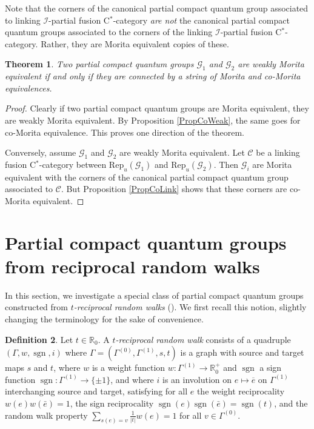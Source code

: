 \documentclass[10pt]{article}
\DeclareMathOperator{\sgn}{\mathrm{sgn}}
\newcommand{\R}{\mathbb{R}}
\newcommand{\CatCC}{\mathscr{C}}
\newcommand{\Rep}{\mathrm{Rep}}
\newtheorem{Theorem}{Theorem}[section]
\theoremstyle{definition}
\newtheorem{Def}[Theorem]{Definition}
\numberwithin{equation}{section}
\begin{document}
Note that the corners of the canonical partial compact quantum group associated to linking $\mathscr{I}$-partial fusion C$^*$-category \emph{are not} the canonical partial compact quantum groups associated to the corners of the linking $\mathscr{I}$-partial fusion C$^*$-category. Rather, they are Morita equivalent copies of these.

\begin{Theorem} Two partial compact quantum groups $\mathscr{G}_1$ and $\mathscr{G}_2$ are weakly Morita equivalent if and only if they are connected by a string of Morita and co-Morita equivalences. 
\end{Theorem}

\begin{proof} Clearly if two partial compact quantum groups are Morita equivalent, they are weakly Morita equivalent. By Proposition \ref{PropCoWeak}, the same goes for co-Morita equivalence. This proves one direction of the theorem. 

Conversely, assume $\mathscr{G}_1$ and $\mathscr{G}_2$ are weakly Morita equivalent. Let $\CatCC$ be a linking fusion C$^*$-category between $\Rep_u(\mathscr{G}_1)$ and $\Rep_u(\mathscr{G}_2)$. Then $\mathscr{G}_i$ are Morita equivalent with the corners of the canonical partial compact quantum group associated to $\CatCC$. But Proposition \ref{PropCoLink} shows that these corners are co-Morita equivalent. 
\end{proof} 


\section{Partial compact quantum groups from reciprocal random walks}\label{SecDyn}

In this section, we investigate a special class of partial compact quantum groups constructed from \emph{$t$-reciprocal random walks} (\cite{DCY1}). We first recall this notion, slightly changing the terminology for the sake of convenience.

\begin{Def} Let $t\in \R_0$. A \emph{$t$-reciprocal random walk} consists of a quadruple $(\Gamma,w,\sgn,i)$ where $\Gamma=(\Gamma^{(0)},\Gamma^{(1)},s,t)$ is a graph with source and target maps $s$ and $t$, where $w$ is a weight function $w:\Gamma^{(1)}\rightarrow \R_0^+$ and $\sgn$ a sign function $\sgn:\Gamma^{(1)}\rightarrow \{\pm 1\}$, and where $i$ is an involution on $e\mapsto \overline{e}$ on $\Gamma^{(1)}$ interchanging source and target,  satisfying for all $e$ the weight reciprocality $w(e)w(\bar{e}) = 1$, the sign reciprocality $\sgn(e)\sgn(\bar{e}) = \sgn(t)$, and the random walk property $\sum_{s(e)=v}  \frac{1}{|t|}w(e) = 1$ for all $v\in \Gamma^{(0)}$.
\end{Def}
 
\end{document}
